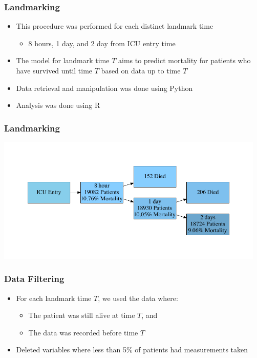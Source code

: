 \documentclass[table]{beamer}
\begin{document}
\begin{frame}
	\frametitle{Landmarking}
	\begin{itemize}
		\item This procedure was performed for each distinct landmark time
		\begin{itemize}
			\item 8 hours, 1 day, and 2 day from ICU entry time
		\end{itemize}
		\item The model for landmark time $T$ aims to predict mortality for patients who have survived until time $T$ based on data up to time $T$
		\item Data retrieval and manipulation was done using Python
		\item Analysis was done using R
	\end{itemize}
\end{frame}

\begin{frame}
	\frametitle{Landmarking}
	\includegraphics[height=6cm]{Images/Graphs/Landmark.pdf}
\end{frame}


\begin{frame}
	\frametitle{Data Filtering}
	\begin{itemize}
		\item For each landmark time $T$, we used the data where:
		\begin{itemize}
			\item The patient was still alive at time $T$, and
			\item The data was recorded before time $T$
		\end{itemize}
		\item Deleted variables where less than 5\% of patients had measurements taken
	\end{itemize}
\end{frame}
\end{document}
